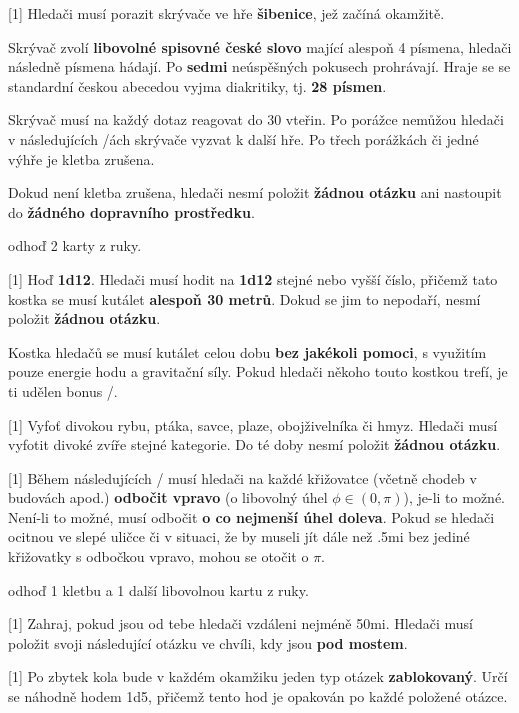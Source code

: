 \begin{cards}
	 Hledači musí porazit skrývače ve hře \textbf{šibenice}, jež začíná okamžitě.

	Skrývač zvolí \textbf{libovolné spisovné české slovo} mající alespoň 4 písmena, hledači následně písmena hádají. Po \textbf{sedmi} neúspěšných pokusech prohrávají. Hraje se se standardní českou abecedou vyjma diakritiky, tj. \textbf{28 písmen}.

	Skrývač musí na každý dotaz reagovat do 30 vteřin. Po porážce nemůžou hledači v následujících \timecursehangmancooldown/ách skrývače vyzvat k další hře. Po třech porážkách či jedné výhře je kletba zrušena.

	Dokud není kletba zrušena, hledači nesmí položit \textbf{žádnou otázku} ani nastoupit do \textbf{žádného dopravního prostředku}.

	\cost odhoď 2 karty z ruky.

	 Hoď \textbf{1d12}. Hledači musí hodit na \textbf{1d12} stejné nebo vyšší číslo, přičemž tato kostka se musí kutálet \textbf{alespoň 30 metrů}. Dokud se jim to nepodaří, nesmí položit \textbf{žádnou otázku}.

	Kostka hledačů se musí kutálet celou dobu \textbf{bez jakékoli pomoci}, s využitím pouze energie hodu a gravitační síly. Pokud hledači někoho touto kostkou trefí, je ti udělen bonus \timecursetumblehit/.

	 Vyfoť divokou rybu, ptáka, savce, plaze, obojživelníka či hmyz. Hledači musí vyfotit divoké zvíře stejné kategorie. Do té doby nesmí položit \textbf{žádnou otázku}.

	 Během následujících \timecurseturnright/ musí hledači na každé křižovatce (včetně chodeb v budovách apod.) \textbf{odbočit vpravo} (o libovolný úhel $\phi \in (0, \pi)$), je-li to možné. Není-li to možné, musí odbočit \textbf{o co nejmenší úhel doleva}. Pokud se hledači ocitnou ve slepé uličce či v situaci, že by museli jít dále než \dist.5mi bez jediné křižovatky s odbočkou vpravo, mohou se otočit o $\pi$.

	\cost odhoď 1 kletbu a 1 další libovolnou kartu z ruky.

	 Zahraj, pokud jsou od tebe hledači vzdáleni nejméně \dist50mi. Hledači musí položit svoji následující otázku ve chvíli, kdy jsou \textbf{pod mostem}.

	 Po zbytek kola bude v každém okamžiku jeden typ otázek \textbf{zablokovaný}. Určí se náhodně hodem 1d5, přičemž tento hod je opakován po každé položené otázce.


\end{cards}
